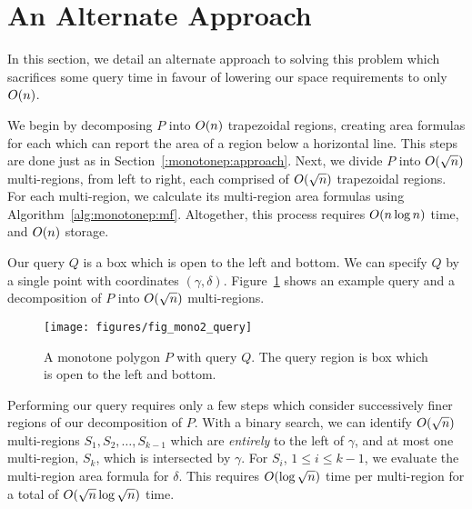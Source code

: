 \section{An Alternate Approach}
\label{:monotonep:alt}

In this section, we detail an alternate approach to solving this problem which sacrifices some query time in favour of lowering our space requirements to only $O\!\left(n\right)$.

We begin by decomposing $P$ into $O\!\left(n\right)$ trapezoidal regions, creating area formulas for each which can report the area of a region below a horizontal line.  
This steps are done just as in Section~\ref{:monotonep:approach}.  
Next, we divide $P$ into $O\!\left(\sqrt{n}\right)$ multi-regions, from left to right, each comprised of $O\!\left(\sqrt{n}\right)$ trapezoidal regions.
For each multi-region, we calculate its multi-region area formulas using Algorithm~\ref{alg:monotonep:mf}.  
Altogether, this process requires $O\!\left(n\log{n}\right)$ time, and $O\!\left(n\right)$ storage.

Our query $Q$ is a box which is open to the left and bottom.
We can specify $Q$ by a single point with coordinates $(\gamma, \delta)$.  
Figure~\ref{fig:mono2:query} shows an example query and a decomposition of $P$ into $O\!\left(\sqrt{n}\right)$ multi-regions.

\begin{figure}[t]
\begin{center}
  \texttt{[image: figures/fig\_mono2\_query]}
  \caption[An alternate query method for a monotone polygon.]{A monotone polygon $P$ with query $Q$. The query region is box which is open to the left and bottom.}
  \label{fig:mono2:query}
\end{center}
\end{figure}

Performing our query requires only a few steps which consider successively finer regions of our decomposition of $P$.
With a binary search, we can identify $O\!\left(\sqrt{n}\right)$ multi-regions $S_1, S_2, \ldots, S_{k-1}$ which are \emph{entirely} to the left of $\gamma$, and at most one multi-region, $S_{k}$, which is intersected by $\gamma$.  
For $S_i$, $1 \leq i \leq k-1$, we evaluate the multi-region area formula for $\delta$. 
This requires $O\!\left(\log{\sqrt{n}}\right)$ time per multi-region for a total of $O\!\left(\sqrt{n}\log{\sqrt{n}}\right)$ time.

